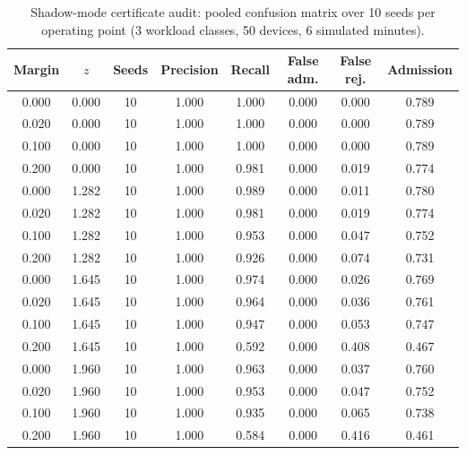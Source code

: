 \begin{table}
\centering
\small
\caption{Shadow-mode certificate audit: pooled confusion matrix over 10 seeds per operating point (3 workload classes, 50 devices, 6 simulated minutes).}
\label{tab:p3-calibration}
\begin{tabular}{cccccccc}
\toprule
Margin & $z$ & Seeds & Precision & Recall & False adm. & False rej. & Admission \\
\midrule
0.000 & 0.000 & 10 & 1.000 & 1.000 & 0.000 & 0.000 & 0.789 \\
0.020 & 0.000 & 10 & 1.000 & 1.000 & 0.000 & 0.000 & 0.789 \\
0.100 & 0.000 & 10 & 1.000 & 1.000 & 0.000 & 0.000 & 0.789 \\
0.200 & 0.000 & 10 & 1.000 & 0.981 & 0.000 & 0.019 & 0.774 \\
0.000 & 1.282 & 10 & 1.000 & 0.989 & 0.000 & 0.011 & 0.780 \\
0.020 & 1.282 & 10 & 1.000 & 0.981 & 0.000 & 0.019 & 0.774 \\
0.100 & 1.282 & 10 & 1.000 & 0.953 & 0.000 & 0.047 & 0.752 \\
0.200 & 1.282 & 10 & 1.000 & 0.926 & 0.000 & 0.074 & 0.731 \\
0.000 & 1.645 & 10 & 1.000 & 0.974 & 0.000 & 0.026 & 0.769 \\
0.020 & 1.645 & 10 & 1.000 & 0.964 & 0.000 & 0.036 & 0.761 \\
0.100 & 1.645 & 10 & 1.000 & 0.947 & 0.000 & 0.053 & 0.747 \\
0.200 & 1.645 & 10 & 1.000 & 0.592 & 0.000 & 0.408 & 0.467 \\
0.000 & 1.960 & 10 & 1.000 & 0.963 & 0.000 & 0.037 & 0.760 \\
0.020 & 1.960 & 10 & 1.000 & 0.953 & 0.000 & 0.047 & 0.752 \\
0.100 & 1.960 & 10 & 1.000 & 0.935 & 0.000 & 0.065 & 0.738 \\
0.200 & 1.960 & 10 & 1.000 & 0.584 & 0.000 & 0.416 & 0.461 \\
\bottomrule
\end{tabular}
\par\vspace{2pt}{\footnotesize\raggedright Precision $=$ TP$/$admitted; false admission $=$ FP$/$admitted; false rejection $=$ FN$/$feasible. The default operating point is $z=1.282$, margin $=0.02$.\par}
\end{table}
